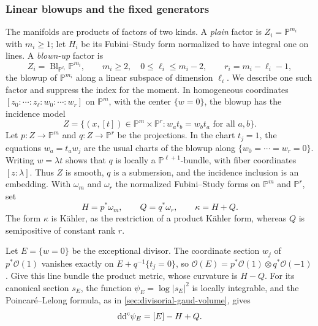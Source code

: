 \subsubsection{Linear blowups and the fixed generators}
The manifolds are products of factors of two kinds. A \emph{plain} factor is $Z_i=\mathbb P^{m_i}$ with $m_i\geq1$; let $H_i$ be its Fubini--Study form normalized to have integral one on lines. A \emph{blown-up} factor is
\[
 Z_i=\operatorname{Bl}_{\mathbb P^{\ell_i}}\mathbb P^{m_i},
 \qquad m_i\geq2,\quad 0\leq\ell_i\leq m_i-2,
 \qquad r_i=m_i-\ell_i-1,
\]
the blowup of $\mathbb P^{m_i}$ along a linear subspace of dimension $\ell_i$. We describe one such factor and suppress the index for the moment. In homogeneous coordinates $[z_0:\cdots:z_\ell:w_0:\cdots:w_r]$ on $\mathbb P^m$, with the center $\{w=0\}$, the blowup has the incidence model
\[
 Z=\{(x,[t])\in\mathbb P^m\times\mathbb P^r:
                         w_at_b=w_bt_a\text{ for all }a,b\}.
\]
Let $p\colon Z\to\mathbb P^m$ and $q\colon Z\to\mathbb P^r$ be the projections. In the chart $t_j=1$, the equations $w_a=t_aw_j$ are the usual charts of the blowup along $\{w_0=\cdots=w_r=0\}$. Writing $w=\lambda t$ shows that $q$ is locally a $\mathbb P^{\ell+1}$-bundle, with fiber coordinates $[z:\lambda]$. Thus $Z$ is smooth, $q$ is a submersion, and the incidence inclusion is an embedding. With $\omega_m$ and $\omega_r$ the normalized Fubini--Study forms on $\mathbb P^m$ and $\mathbb P^r$, set
\[
 H=p^*\omega_m,\qquad Q=q^*\omega_r,\qquad \kappa=H+Q.
\]
The form $\kappa$ is K\"ahler, as the restriction of a product K\"ahler form, whereas $Q$ is semipositive of constant rank $r$.

Let $E=\{w=0\}$ be the exceptional divisor. The coordinate section $w_j$ of $p^*\mathcal O(1)$ vanishes exactly on $E+q^{-1}\{t_j=0\}$, so $\mathcal O(E)=p^*\mathcal O(1)\otimes q^*\mathcal O(-1)$. Give this line bundle the product metric, whose curvature is $H-Q$. For its canonical section $s_E$, the function $\psi_E=\log|s_E|^2$ is locally integrable, and the Poincar\'e--Lelong formula, as in \cref{sec:divisorial-gaud-volume}, gives
\begin{equation}\label{eq:nef-projective-exceptional-potential}
 \mathrm{dd}^{\mathrm{c}}\psi_E=[E]-H+Q.
\end{equation}

